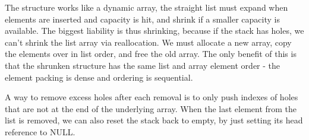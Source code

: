 The structure works like a dynamic array, the straight list must expand when elements are inserted and capacity is hit, and shrink if a smaller capacity is available. The biggest liability is thus shrinking, because if the stack has holes, we can't shrink the list array via reallocation. We must allocate a new array, copy the elements over in list order, and free the old array. The only benefit of this is that the shrunken structure has the same list and array element order - the element packing is dense and ordering is sequential. 

A way to remove excess holes after each removal is to only push indexes of holes that are not at the end of the underlying array. When the last element from the list is removed, we can also reset the stack back to empty, by just setting its head reference to NULL.

